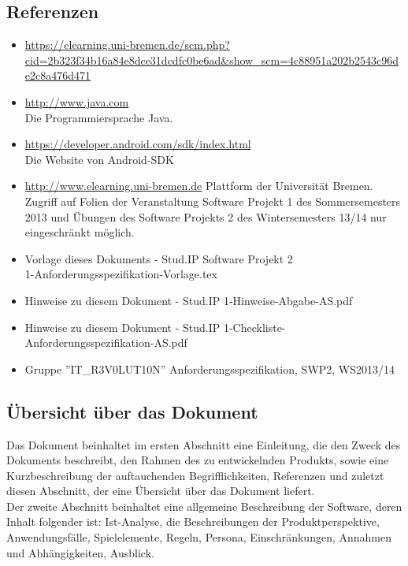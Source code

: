 \documentclass[fontsize=12pt,paper=a4,twoside]{scrartcl}
\begin{document}
\subsection{Referenzen} \label{subsec:Referenzen} 
\begin{itemize}
	\item{\url{https://elearning.uni-bremen.de/scm.php?cid=2b323f34b16a84e8dce31dcdfc0be6ad\&show\_scm=4c88951a202b2543c96de2c8a476d471}}
	\item{\url{http://www.java.com}\\
	Die Programmiersprache Java.}  
	\item{\url{https://developer.android.com/sdk/index.html}\\
	Die Website von Android-SDK} 
	\item{\url{http://www.elearning.uni-bremen.de} Plattform der Universität Bremen. Zugriff auf Folien der Veranstaltung Software Projekt 1 des Sommersemesters 2013 und Übungen des Software Projekts 2 des Wintersemesters 13/14 nur eingeschränkt möglich.} 
	\item{Vorlage dieses Dokuments - Stud.IP Software Projekt 2\\
	1-Anforderungsspezifikation-Vorlage.tex} 
	\item{Hinweise zu diesem Dokument - Stud.IP 1-Hinweise-Abgabe-AS.pdf} 
	\item{Hinweise zu diesem Dokument - Stud.IP 1-Checkliste-Anforderungsspezifikation-AS.pdf} 
	\item Gruppe ''IT\_R3V0LUT10N'' Anforderungsspezifikation, SWP2, WS2013/14
	
\end{itemize}

 

\subsection{Übersicht über das Dokument}

  
Das Dokument beinhaltet im ersten Abschnitt eine Einleitung, die den Zweck des Dokuments beschreibt,
den Rahmen des zu entwickelnden Produkts, sowie eine Kurzbeschreibung der auftauchenden Begrifflichkeiten, Referenzen und zuletzt diesen Abschnitt, der eine Übersicht über das Dokument liefert.\\

Der zweite Abschnitt beinhaltet eine allgemeine Beschreibung der Software, deren Inhalt folgender ist: Ist-Analyse, die Beschreibungen der Produktperspektive, Anwendungsfälle, Spielelemente, Regeln, Persona, Einschränkungen, Annahmen und
Abhängigkeiten, Ausblick.\\
\end{document}
